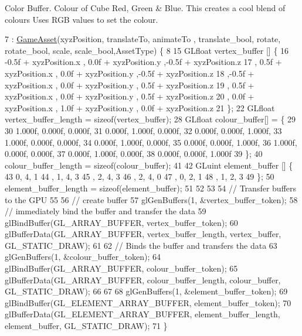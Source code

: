 Color Buffer. Colour of Cube Red, Green \& Blue. This creates a cool blend of colours Uses R\+G\+B values to set the colour.
\begin{DoxyCode}
7 : \hyperlink{class_game_asset_a9de932075d9b4263e7fb24fbfd163a61}{GameAsset}(xyzPosition, translateTo, animateTo , translate\_bool, rotate, rotate\_bool, scale,
      scale\_bool,AssetType) \{
8 
15   GLfloat vertex\_buffer [] \{
16       -0.5f + xyzPosition.x  , 0.0f + xyzPosition.y   ,-0.5f + xyzPosition.z
17      , 0.5f + xyzPosition.x  , 0.0f + xyzPosition.y   ,-0.5f + xyzPosition.z
18      ,-0.5f + xyzPosition.x  , 0.0f + xyzPosition.y   , 0.5f + xyzPosition.z
19      , 0.5f + xyzPosition.x  , 0.0f + xyzPosition.y   , 0.5f + xyzPosition.z
20      , 0.0f + xyzPosition.x  , 1.0f + xyzPosition.y   , 0.0f + xyzPosition.z
21   \};
22   GLfloat vertex\_buffer\_length = \textcolor{keyword}{sizeof}(vertex\_buffer);
28   GLfloat colour\_buffer[] = \{
29 
30      1.000f, 0.000f, 0.000f,
31      0.000f, 1.000f, 0.000f,
32      0.000f, 0.000f, 1.000f,
33      1.000f, 0.000f, 0.000f,
34      0.000f, 1.000f, 0.000f,
35      0.000f, 0.000f, 1.000f,
36      1.000f, 0.000f, 0.000f,
37      0.000f, 1.000f, 0.000f,
38      0.000f, 0.000f, 1.000f
39   \};
40  colour\_buffer\_length = \textcolor{keyword}{sizeof}(colour\_buffer);
41   
42   GLuint element\_buffer []  \{
43       0, 4, 1   
44     , 1, 4, 3
45     , 2, 4, 3   
46     , 2, 4, 0
47     , 0, 2, 1
48     , 1, 2, 3
49   \};
50   element\_buffer\_length = \textcolor{keyword}{sizeof}(element\_buffer);
51 
52 
53 
54   \textcolor{comment}{// Transfer buffers to the GPU}
55 
56   \textcolor{comment}{// create buffer}
57   glGenBuffers(1, &vertex\_buffer\_token);
58   \textcolor{comment}{// immediately bind the buffer and transfer the data}
59   glBindBuffer(GL\_ARRAY\_BUFFER, vertex\_buffer\_token);
60   glBufferData(GL\_ARRAY\_BUFFER, vertex\_buffer\_length, vertex\_buffer, GL\_STATIC\_DRAW);
61 
62   \textcolor{comment}{// Binds the buffer and transfers the data}
63   glGenBuffers(1, &colour\_buffer\_token);
64   glBindBuffer(GL\_ARRAY\_BUFFER, colour\_buffer\_token);
65   glBufferData(GL\_ARRAY\_BUFFER, colour\_buffer\_length, colour\_buffer, GL\_STATIC\_DRAW);
66 
67 
68   glGenBuffers(1, &element\_buffer\_token);
69   glBindBuffer(GL\_ELEMENT\_ARRAY\_BUFFER, element\_buffer\_token);
70   glBufferData(GL\_ELEMENT\_ARRAY\_BUFFER, element\_buffer\_length, element\_buffer, GL\_STATIC\_DRAW);
71 \}
\end{DoxyCode}
\hypertarget{class_pyramid_asset_afb388a196f43a3808b2d4f6fdb89ee84}{}
